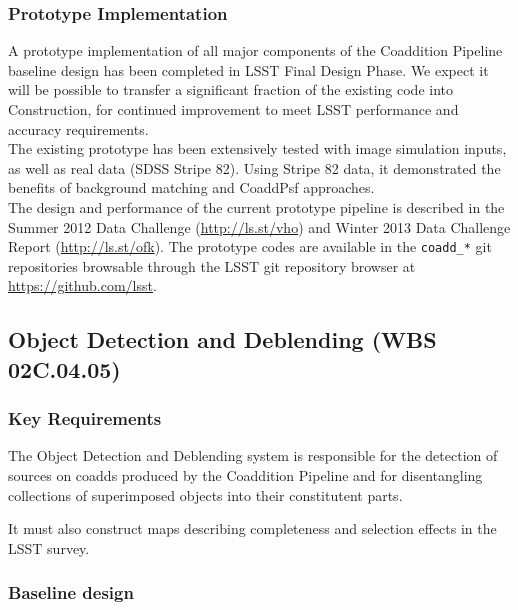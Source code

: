 \documentclass[12pt]{article}
\newcommand{\wbsDetDeblend}{WBS 02C.04.05}
\begin{document}
\subsubsection{Prototype Implementation}

A prototype implementation of all major components of the Coaddition Pipeline baseline design has been completed in LSST Final Design Phase. We expect it will be possible to transfer a significant fraction of the existing code into Construction, for continued improvement to meet LSST performance and accuracy requirements.
\\

The existing prototype has been extensively tested with image simulation inputs, as well as real data (SDSS Stripe 82). Using Stripe 82 data, it demonstrated the benefits of background matching and CoaddPsf approaches.
\\

The design and performance of the current prototype pipeline is described in the Summer 2012 Data Challenge (\url{http://ls.st/vho}) and Winter 2013 Data Challenge Report (\url{http://ls.st/ofk}). The prototype codes are available in the {\tt coadd\_*} git repositories browsable through the LSST git repository browser at \url{https://github.com/lsst}.

\clearpage

\subsection{Object Detection and Deblending (\wbsDetDeblend)}

\subsubsection{Key Requirements}

The Object Detection and Deblending system is responsible for the detection of
sources on coadds produced by the Coaddition Pipeline and for disentangling
collections of superimposed objects into their constitutent parts.


It must also construct maps describing completeness and selection effects in
the LSST survey.

\subsubsection{Baseline design}
\end{document}
